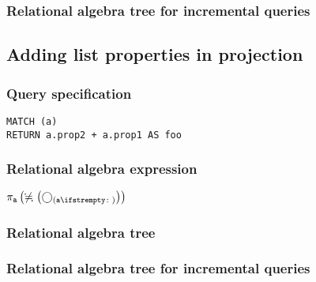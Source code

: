 \subsubsection*{Relational algebra tree for incremental queries}


\subsection{Adding list properties in projection}

\subsubsection*{Query specification}

\begin{lstlisting}
MATCH (a)
RETURN a.prop2 + a.prop1 AS foo
\end{lstlisting}

\subsubsection*{Relational algebra expression}

$\projection{\var{a}} \left(\alldifferent{} \left(\getvertices{a}{}\right)\right)$

\subsubsection*{Relational algebra tree}


\subsubsection*{Relational algebra tree for incremental queries}

